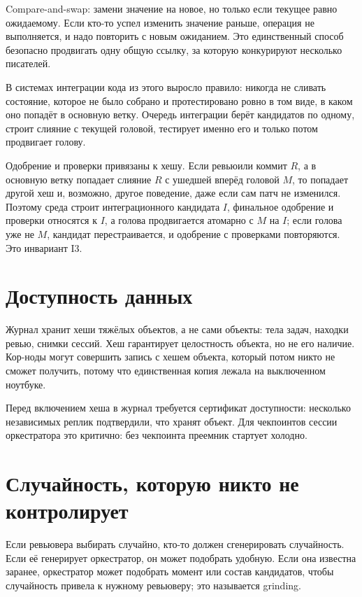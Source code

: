 Compare-and-swap: замени значение на новое, но только если текущее равно ожидаемому. Если кто-то успел изменить значение раньше, операция не выполняется, и надо повторить с новым ожиданием. Это единственный способ безопасно продвигать одну общую ссылку, за которую конкурируют несколько писателей.

В системах интеграции кода из этого выросло правило: никогда не сливать состояние, которое не было собрано и протестировано ровно в том виде, в каком оно попадёт в основную ветку. Очередь интеграции берёт кандидатов по одному, строит слияние с текущей головой, тестирует именно его и только потом продвигает голову.

\begin{likbez}
Одобрение и проверки привязаны к хешу. Если ревьюили коммит $R$, а в основную ветку попадает слияние $R$ с ушедшей вперёд головой $M$, то попадает другой хеш и, возможно, другое поведение, даже если сам патч не изменился. Поэтому среда строит интеграционного кандидата $I$, финальное одобрение и проверки относятся к $I$, а голова продвигается атомарно с $M$ на $I$; если голова уже не $M$, кандидат перестраивается, и одобрение с проверками повторяются. Это инвариант I3.
\end{likbez}

\section{Доступность данных}

Журнал хранит хеши тяжёлых объектов, а не сами объекты: тела задач, находки ревью, снимки сессий. Хеш гарантирует целостность объекта, но не его наличие. Кор-ноды могут совершить запись с хешем объекта, который потом никто не сможет получить, потому что единственная копия лежала на выключенном ноутбуке.

\begin{likbez}
Перед включением хеша в журнал требуется сертификат доступности: несколько независимых реплик подтвердили, что хранят объект. Для чекпоинтов сессии оркестратора это критично: без чекпоинта преемник стартует холодно.
\end{likbez}

\section{Случайность, которую никто не контролирует}

Если ревьювера выбирать случайно, кто-то должен сгенерировать случайность. Если её генерирует оркестратор, он может подобрать удобную. Если она известна заранее, оркестратор может подобрать момент или состав кандидатов, чтобы случайность привела к нужному ревьюверу; это называется grinding.

